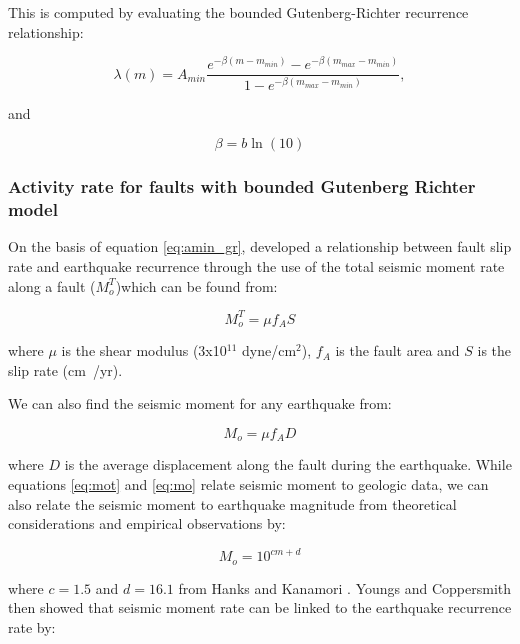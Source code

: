 \begin{enumerate}
This is computed by evaluating the bounded Gutenberg-Richter recurrence relationship:

\begin{equation} \label{eq:amin_gr}
\lambda(m) =
A_{min}\frac{e^{-\beta(m-m_{min})}-e^{-\beta(m_{max}-m_{min})}}{1-e^{-\beta(m_{max}-m_{min})}},
\end{equation}

\citet{dr_kramer96a} and 

\begin{equation}
\beta = b\ln(10)
\end{equation}



\subsubsection{Activity rate for faults with bounded Gutenberg Richter model}
\label{sec:rv_flt_GR}
On the basis of equation \ref{eq:amin_gr},  \citet{dr_youngs85} developed a relationship between fault slip 
rate and earthquake recurrence through the use of the total seismic moment rate along a fault ($M_o^T$)which can be found from:

\begin{equation} \label{eq:mot}
M_o^T = \mu f_A S
\end{equation}

where $\mu$ is the shear modulus (3x10$^{11}$ dyne/cm$^2$), $f_A$ is the fault area and $S$ is the slip rate (cm~/yr). 

We can also find the seismic moment for any earthquake from:

\begin{equation} \label{eq:mo}
M_o = \mu f_A D
\end{equation}

where $D$ is the average displacement along the fault during the earthquake. While equations \ref{eq:mot} and \ref{eq:mo} relate 
seismic moment to geologic data, we can also relate the seismic moment to earthquake magnitude from theoretical considerations and 
empirical observations by:

\begin{equation} \label{eq:mo_mag}
M_o = 10^{cm+d}
\end{equation}

where $c=1.5$ and $d=16.1$ from Hanks and Kanamori \cite{hanks1979}. Youngs and Coppersmith \cite{youngs1985} then showed that seismic 
moment rate can be linked to the earthquake recurrence rate by:


\end{enumerate}
